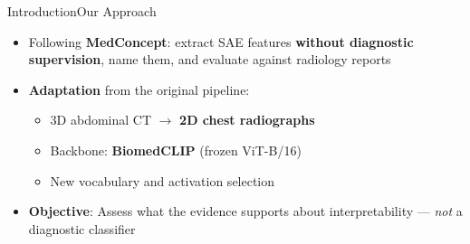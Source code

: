 \begin{frame}{Introduction}{Our Approach}
  \begin{itemize}
    \item Following \textbf{MedConcept}: extract SAE features \textbf{without diagnostic supervision}, name them, and evaluate against radiology reports
    \item \textbf{Adaptation} from the original pipeline:
    \begin{itemize}
      \item 3D abdominal CT $\rightarrow$ \textbf{2D chest radiographs}
      \item Backbone: \textbf{BiomedCLIP} (frozen ViT-B/16)
      \item New vocabulary and activation selection
    \end{itemize}
    \item \textbf{Objective}: Assess what the evidence supports about interpretability --- \textit{not} a diagnostic classifier
  \end{itemize}

\end{frame}